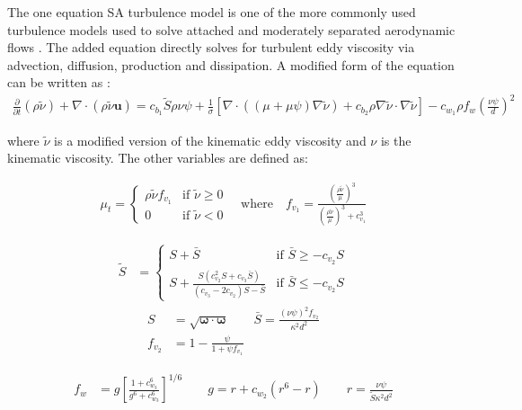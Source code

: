 The one equation SA turbulence model is one of the more commonly used turbulence models used to solve attached and moderately separated aerodynamic flows \cite{spalart1992one}. The added equation directly solves for turbulent eddy viscosity via advection, diffusion, production and dissipation. A modified form of the equation can be written as \cite{burgess2012robust,oliver2008high,moro2011navier}:
\begin{align}
	\frac{\partial}{\partial t}(\rho\tilde\nu) + \nabla\cdot(\rho\tilde\nu\boldsymbol{u}) = c_{b_1}\tilde S \rho\nu\psi + \frac{1}{\sigma}\left[\nabla\cdot((\mu + \mu\psi)\nabla\tilde\nu) + c_{b_2}\rho\nabla\tilde\nu\cdot\nabla\tilde\nu\right] - c_{w_1}\rho f_w \left(\frac{\nu\psi}{d}\right)^2
\end{align}

where $\tilde\nu$ is a modified version of the kinematic eddy viscosity and $\nu$ is the kinematic viscosity. The other variables are defined as:

\begin{align}
	 \mu_t =
	  \begin{cases}
	   \rho\tilde\nu f_{v_1} & \text{if } \tilde\nu \ge 0 \\
	   0       & \text{if } \tilde\nu < 0
	  \end{cases}
	  \quad \mbox{where} \quad f_{v_1} = \frac{\left(\frac{\rho\tilde\nu}{\mu}\right)^3}{\left(\frac{\rho\tilde\nu}{\mu}\right)^3 + c_{v_1}^3}
\end{align}

\begin{align}
	\tilde S &=
	\begin{cases}
	   S + \bar S & \text{if } \bar S \ge -c_{v_2}S \\
	   S + \frac{S(c_{v_2}^2 S + c_{v_3}\bar S)}{(c_{v_3} - 2c_{v_2})S - \bar S} & \text{if } \bar S \le -c_{v_2}S
	\end{cases}
\end{align}
\begin{align}
	S &= \sqrt{\boldsymbol{\omega}\cdot\boldsymbol{\omega}}
	\qquad \bar S = \frac{(\nu\psi)^2 f_{v_2}}{\kappa^2 d^2} \\
	f_{v_2} &= 1 - \frac{\psi}{1 + \psi f_{v_1}}
\end{align}

\begin{align}
	f_w &= g\left[\frac{1 + c_{w_3}^6}{g^6 + c_{w_3}^6}\right]^{1/6} 
	\qquad g = r + c_{w_2}(r^6 - r) 
	\qquad r = \frac{\nu\psi}{\tilde S \kappa^2 d^2}
\end{align}

